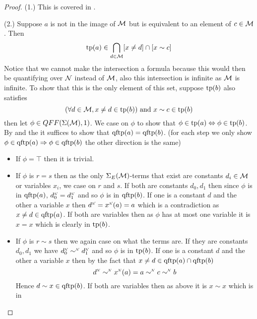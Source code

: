 \begin{proof}
    (1.) This is covered in .
    
    (2.)
    Suppose $a$ is not in the image of $\mathcal{M}$ but is equivalent to 
    an element of $c \in \mathcal{M}$.
    Then 
    \[\operatorname{tp}(a) \in \bigcap_{d \in \mathcal{M}} [x \ne d] \cap [x \sim c]\]
    Notice that we cannot make the intersection a formula because 
    this would then be quantifying over $\mathcal{N}$ instead of $\mathcal{M}$,
    also this intersection is infinite as $\mathcal{M}$ is infinite.
    To show that this is the only element of this set, 
    suppose $\operatorname{tp}(b)$ also satisfies 
    \[(\forall d \in \mathcal{M}, x \ne d \in \operatorname{tp}(b)) \text{ and } x \sim c \in \operatorname{tp}(b)\]
    then let $\phi \in QFF(\Sigma(\mathcal{M}),1)$.
    We case on $\phi$ to show that $\phi \in \operatorname{tp}(a) \Leftrightarrow \phi \in \operatorname{tp}(b)$.
    By  and the 
    it suffices to show that $\operatorname{qftp}(a) = \operatorname{qftp}(b)$.
    (for each step we only show $\phi \in \operatorname{qftp}(a) \Rightarrow \phi \in \operatorname{qftp}(b)$
    the other direction is the same)
    \begin{itemize}
        \item If $\phi = \top$ then it is trivial.
        \item If $\phi$ is $r = s$ then as the only $\Sigma_E(\mathcal{M})$-terms 
            that exist are constants $d_i \in \mathcal{M}$ or variables $x_i$, 
            we case on $r$ and $s$.
            If both are constants $d_0, d_1$ then since $\phi$ is in $\operatorname{qftp}(a)$,
            $\nnintp{d_0} = \nnintp{d_1}$ and so $\phi$ is in $\operatorname{qftp}(b)$.
            If one is a constant $d$ and the other a variable $x$ then 
            $\nnintp{d} = \nnintp{x}(a) = a$ which is a contradiction as 
            $x \ne d \in \operatorname{qftp}(a)$.
            If both are variables then as $\phi$ has at most one variable it 
            is $x = x$ which is clearly in $\operatorname{tp}(b)$.
        \item If $\phi$ is $r \sim s$ then we again case on what the terms are.
            If they are constants $d_0,d_1$ 
            we have $\nnintp{d_0} \nnintp{\sim} \nnintp{d_1}$ 
            and so $\phi$ is in $\operatorname{tp}(b)$.
            If one is a constant $d$ and the other a variable $x$ then by 
            the fact that $x \ne d \in \operatorname{qftp}(a) \cap \operatorname{qftp}(b)$ 
            \[\nnintp{d} \nnintp{\sim} \nnintp{x}(a) = a 
            \nnintp{\sim} c \nnintp{\sim} b\]
            Hence $d \sim x \in \operatorname{qftp}(b)$.
            If both are variables then as above it is $x \sim x$ which is in 

\end{itemize}
\end{proof}
